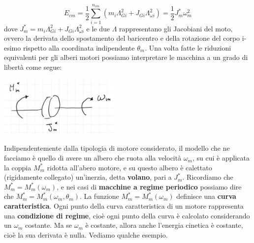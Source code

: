 \[
    E_{cm} = \frac{1}{2} \sum_{i=1}^{n_{cm}} \left( m_i \Lambda_{Gi}^2 + J_{Gi} \Lambda_{\omega i}^2 \right) = \frac{1}{2} J_m^* \omega_m^2
\]
dove $J_m^* = m_i \Lambda_{Gi}^2 + J_{Gi} \Lambda_{\omega i}^2$ e le due $\Lambda$ rappresentano gli Jacobiani del moto, ovvero la derivata dello spostamento del baricentro e della rotazione del corpo i-esimo rispetto alla coordinata indipendente $\theta_m$.\newline
\newline
Una volta fatte le riduzioni equivalenti per gli alberi motori possiamo interpretare le macchina a un grado di libertà come segue:
\begin{center}
    \includegraphics[height=3cm]{../lezione12/img2.JPG}
\end{center}
Indipendentemente dalla tipologia di motore considerato, il modello che ne facciamo è quello di avere un albero che ruota alla velocità $\omega_m$, su cui è applicata la coppia $M_m^*$ ridotta all'abero motore, e su questo albero è calettato (rigidamente collegato) un'inerzia, detta \textbf{volano}, pari a $J_m^*$.\newline
\newline
Ricordiamo che $M_m^* = M_m^*(\omega_m)$, e nei casi di \textbf{macchine a regime periodico} possiamo dire che  $M_m^* = M_m^*(\omega_m, \theta_m)$.\newline
\newline
La funzione $M_m^* = M_m^*(\omega_m)$ definisce una \textbf{curva caratteristica}.\newline
Ogni punto della curva caratteristica di un motore rappresenta una \textbf{condizione di regime}, cioè ogni punto della curva è calcolato considerando un $\omega_m$ costante. Ma se $\omega_m$ è costante, allora anche l'energia cinetica è costante, cioè la sua derivata è nulla.\newline
\newline
Vediamo qualche esempio.
